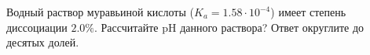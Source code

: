 
Водный
раствор муравьиной кислоты ($K_a = 1.58 \cdot 10^{-4}$) имеет степень
диссоциации $2.0\%$. Рассчитайте pH данного раствора? Ответ округлите до десятых долей.

